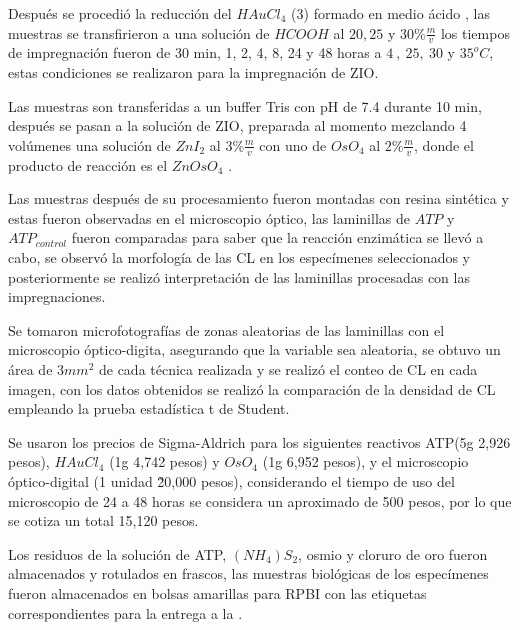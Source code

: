 Después se procedió la reducción del $HAuCl_{4}$ (3) formado en medio ácido \cite{article:reduccionOro}, las muestras se transfirieron a una solución de $HCOOH$ al $20,25$ y $30\%\frac{m}{v}$ los tiempos de impregnación fueron de 30 min, 1, 2, 4, 8, 24 y 48 horas a $4~,~25,~30$ y $35^oC$, estas condiciones se realizaron para la impregnación de ZIO.




Las muestras son transferidas a un buffer Tris con pH de 7.4 durante 10 min, después se pasan a la solución de ZIO, preparada al momento mezclando 4 volúmenes una solución de $ZnI_{2}$ al $3\%\frac{m}{v}$ con uno de $OsO_{4}$ al $2\%\frac{m}{v}$, donde el producto de reacción es el $ZnOsO_{4}$ \cite{article:productoZIO}.


Las muestras después de su procesamiento fueron montadas con resina sintética y estas fueron observadas en el microscopio óptico, las laminillas de $ATP$ y $ATP_{control}$ fueron comparadas para saber que la reacción enzimática se llevó a cabo, se observó la morfología de las CL en los especímenes seleccionados y posteriormente se realizó interpretación de las laminillas procesadas con las impregnaciones.


Se tomaron microfotografías de zonas aleatorias de las laminillas con el microscopio óptico-digita, asegurando que la variable sea aleatoria, se obtuvo un área de $3mm^{2}$ de cada técnica realizada y se realizó el conteo de CL en cada imagen, con los datos obtenidos se realizó la comparación de la densidad de CL empleando la prueba estadística t de Student.


Se usaron los precios de Sigma-Aldrich para los siguientes reactivos ATP(5g 2,926 pesos), $HAuCl_{4}$ (1g 4,742 pesos) y $OsO_{4}$ (1g 6,952 pesos), y el microscopio óptico-digital (1 unidad \~20,000 pesos), considerando el tiempo de uso del microscopio de 24 a 48 horas se considera un aproximado de 500 pesos, por lo que se cotiza un total 15,120 pesos.


Los residuos de la solución de ATP, $(NH_{4})S_{2}$, osmio y cloruro de oro fueron almacenados y rotulados en frascos, las muestras biológicas de los especímenes fueron almacenados en bolsas amarillas para RPBI con las etiquetas correspondientes para la entrega a la .


